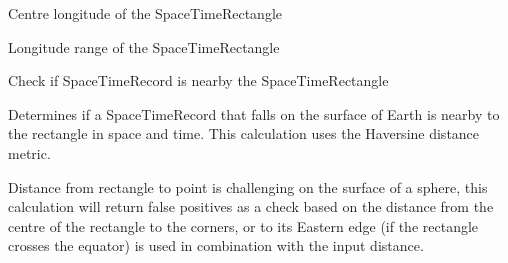 \documentclass[letterpaper,10pt,english]{sphinxmanual}
\begin{document}
\begin{fulllineitems}

\begin{fulllineitems}
\label{\detokenize{shape:geotrees.shape.SpaceTimeRectangle.lon}}
\pysigstartsignatures
\pysigline
{}
\pysigstopsignatures
\sphinxAtStartPar
Centre longitude of the SpaceTimeRectangle

\end{fulllineitems}


\begin{fulllineitems}
\label{\detokenize{shape:geotrees.shape.SpaceTimeRectangle.lon_range}}
\pysigstartsignatures
\pysigline
{}
\pysigstopsignatures
\sphinxAtStartPar
Longitude range of the SpaceTimeRectangle

\end{fulllineitems}


\begin{fulllineitems}
\label{\detokenize{shape:geotrees.shape.SpaceTimeRectangle.nearby}}
\pysigstartsignatures
\pysiglinewithargsret
{}
{\sphinxparamcomma {}\sphinxparamcomma {}}
{}
\pysigstopsignatures
\sphinxAtStartPar
Check if SpaceTimeRecord is nearby the SpaceTimeRectangle

\sphinxAtStartPar
Determines if a SpaceTimeRecord that falls on the surface of Earth is
nearby to the rectangle in space and time. This calculation uses the
Haversine distance metric.

\sphinxAtStartPar
Distance from rectangle to point is challenging on the surface of a
sphere, this calculation will return false positives as a check based
on the distance from the centre of the rectangle to the corners, or
to its Eastern edge (if the rectangle crosses the equator) is used in
combination with the input distance.


\end{fulllineitems}
\end{fulllineitems}
\end{document}
